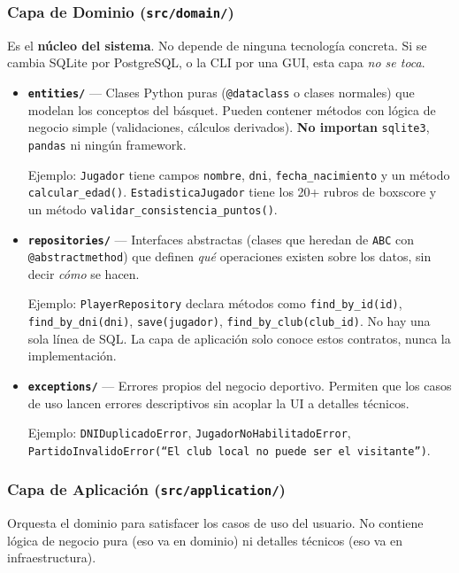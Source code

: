 \documentclass[11pt,a4paper]{article}
\newcommand{\fpath}[1]{\texttt{\small #1}}
\begin{document}
\subsubsection{Capa de Dominio (\texttt{src/domain/})}

Es el \textbf{núcleo del sistema}. No depende de ninguna tecnología concreta. Si se cambia SQLite por PostgreSQL, o la CLI por una GUI, esta capa \textit{no se toca}.

\begin{itemize}
  \item \textbf{\fpath{entities/}} — Clases Python puras (\fpath{@dataclass} o clases normales) que modelan los conceptos del básquet. Pueden contener métodos con lógica de negocio simple (validaciones, cálculos derivados). \textbf{No importan} \fpath{sqlite3}, \fpath{pandas} ni ningún framework.

  Ejemplo: \fpath{Jugador} tiene campos \fpath{nombre}, \fpath{dni}, \fpath{fecha\_nacimiento} y un método \fpath{calcular\_edad()}. \fpath{EstadisticaJugador} tiene los 20+ rubros de boxscore y un método \fpath{validar\_consistencia\_puntos()}.

  \item \textbf{\fpath{repositories/}} — Interfaces abstractas (clases que heredan de \fpath{ABC} con \fpath{@abstractmethod}) que definen \textit{qué} operaciones existen sobre los datos, sin decir \textit{cómo} se hacen.

  Ejemplo: \fpath{PlayerRepository} declara métodos como \fpath{find\_by\_id(id)}, \fpath{find\_by\_dni(dni)}, \fpath{save(jugador)}, \fpath{find\_by\_club(club\_id)}. No hay una sola línea de SQL. La capa de aplicación solo conoce estos contratos, nunca la implementación.

  \item \textbf{\fpath{exceptions/}} — Errores propios del negocio deportivo. Permiten que los casos de uso lancen errores descriptivos sin acoplar la UI a detalles técnicos.

  Ejemplo: \fpath{DNIDuplicadoError}, \fpath{JugadorNoHabilitadoError}, \fpath{PartidoInvalidoError(``El club local no puede ser el visitante'')}.
\end{itemize}

\subsubsection{Capa de Aplicación (\texttt{src/application/})}

Orquesta el dominio para satisfacer los casos de uso del usuario. No contiene lógica de negocio pura (eso va en dominio) ni detalles técnicos (eso va en infraestructura).
\end{document}
